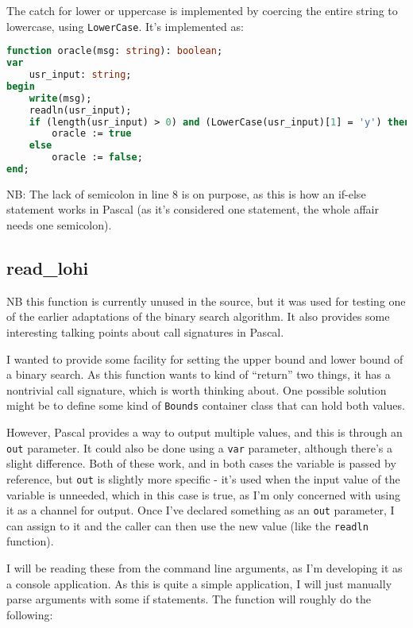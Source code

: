 \documentclass[fleqn,a4paper,11pt]{article}
\begin{document}
    The catch for lower or uppercase is implemented by coercing the entire
    string to lowercase, using \verb|LowerCase|. It's implemented as:

\begin{lstlisting}[language=Pascal, caption=oracle implementation]
function oracle(msg: string): boolean;
var
    usr_input: string;
begin
    write(msg);
    readln(usr_input);
    if (length(usr_input) > 0) and (LowerCase(usr_input)[1] = 'y') then
        oracle := true
    else
        oracle := false;
end;
\end{lstlisting}

    NB: The lack of semicolon in line 8 is on purpose, as this is how an if-else
    statement works in Pascal (as it's considered one statement, the whole
    affair needs one semicolon).

    \subsection{read\_lohi}

    NB this function is currently unused in the source, but it was used for
    testing one of the earlier adaptations of the binary search algorithm. It
    also provides some interesting talking points about call signatures in
    Pascal.

    I wanted to provide some facility for setting the upper bound and lower
    bound of a binary search. As this function wants to kind of ``return'' two
    things, it has a nontrivial call signature, which is worth thinking about.
    One possible solution might be to define some kind of \verb|Bounds|
    container class that can hold both values.

    However, Pascal provides a way to output multiple values, and this is
    through an \verb|out| parameter. It could also be done using a \verb|var|
    parameter, although there's a slight difference. Both of these work, and in
    both cases the variable is passed by reference, but \verb|out| is slightly
    more specific - it's used when the input value of the variable is unneeded,
    which in this case is true, as I'm only concerned with using it as a channel
    for output. Once I've declared something as an \verb|out| parameter, I can
    assign to it and the caller can then use the new value (like the
    \verb|readln| function).

    I will be reading these from the command line arguments, as I'm developing
    it as a console application. As this is quite a simple application, I will
    just manually parse arguments with some if statements. The function will
    roughly do the following:
\end{document}
